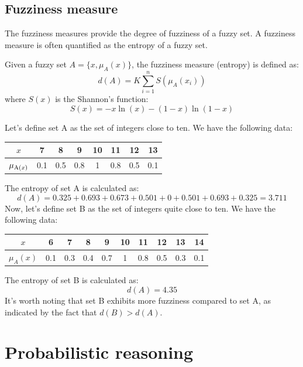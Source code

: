 \documentclass[12pt, a4paper]{report}
\begin{document}
    \section{Fuzziness measure}
    The fuzziness measures provide the degree of fuzziness of a fuzzy set. A fuzziness measure is often quantified as the entropy of a fuzzy set.
    \begin{definition}
        Given a fuzzy set $A=\{x,\mu_A(x)\}$, the fuzziness measure (entropy) is defined as:
        \[d(A)=K \sum_{i=1}^{n}S(\mu_A(x_i))\]
        where $S(x)$ is the Shannon's function: 
        \[S(x)=-x \ln(x)-(1-x)\ln(1-x)\]
    \end{definition}
    \begin{example}
        Let's define set A as the set of integers close to ten. We have the following data:
        \begin{center}
            \begin{tabular}{|c|c|c|c|c|c|c|c|} 
            \hline
                $x$ & 7 & 8 & 9 & 10 & 11 & 12 & 13 \\ \hline
                $\mu_{\textnormal{A}(x)}$ & 0.1 & 0.5 & 0.8 & 1 & 0.8 & 0.5 & 0.1 \\ \hline
            \end{tabular}
        \end{center}
        The entropy of set A is calculated as:
        \[d(A)=0.325+0.693+0.673+0.501+0+0.501+0.693+0.325=3.711\]
        Now, let's define set B as the set of integers quite close to ten. We have the following data:
        \begin{center}
            \begin{tabular}{|c|c|c|c|c|c|c|c|c|c|} 
                \hline
                $x$         & 6     & 7     & 8     & 9     & 10    & 11    & 12    & 13    & 14 \\ \hline
                $\mu_A(x)$  & 0.1   & 0.3   & 0.4   & 0.7   & 1     & 0.8   & 0.5   & 0.3   & 0.1 \\ \hline
            \end{tabular}
        \end{center}
        The entropy of set B is calculated as:
        \[d(A)=4.35\]
        It's worth noting that set B exhibits more fuzziness compared to set A, as indicated by the fact that $d(B)>d(A)$.
    \end{example}
    
\newpage

\chapter{Probabilistic reasoning}
\end{document}
